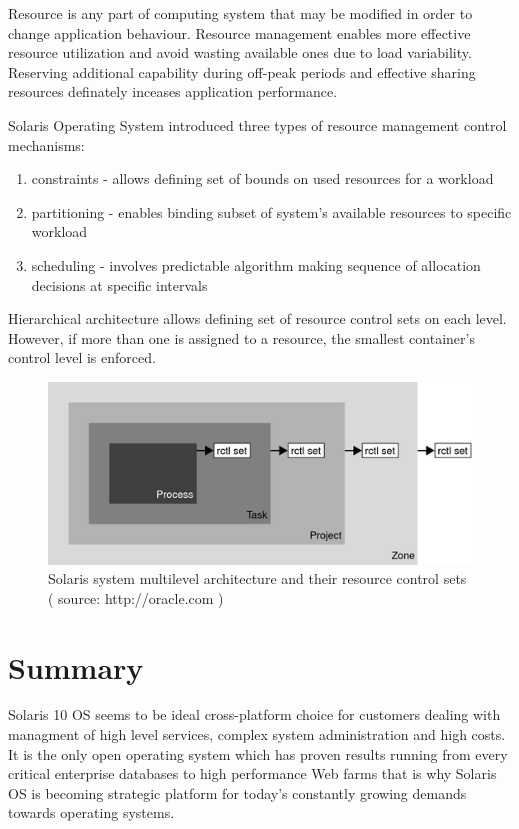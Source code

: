 \documentclass[11pt]{book}
\begin{document}
		Resource is any part of computing system that may be modified in order to change application behaviour. Resource management enables more 
		effective resource utilization and avoid wasting available ones due to load variability. Reserving additional capability
		during off-peak periods and effective sharing resources definately inceases application performance.
		
		Solaris Operating System introduced three types of resource management control mechanisms:
		\begin{enumerate}
        	\item{constraints - allows defining set of bounds on used resources for a workload}
			\item{partitioning - enables binding subset of system's available resources to specific workload}
			\item{scheduling - involves predictable algorithm making sequence of allocation decisions at specific intervals}
		 \end{enumerate}

                Hierarchical architecture allows defining set of resource control sets on each level. However, if more than one is assigned to a resource, the smallest container's control level is enforced. 

                \begin{figure}[H]
			\includegraphics[width=\textwidth]{img/rctrl.png}
			\caption{Solaris system multilevel architecture and their resource control sets ( source: http://oracle.com ) }
		\end{figure}
                

    \section*{Summary}

                Solaris 10 OS seems to be ideal cross-platform choice for customers dealing with managment of high level services, complex system administration and high costs. It is the only open operating system which has proven 
                results running from every critical enterprise databases to high performance Web farms that is why Solaris OS is becoming strategic platform for today's constantly growing demands towards operating systems. 
\end{document}
